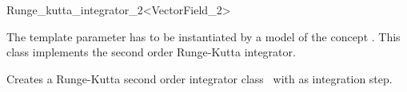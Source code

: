 

\begin{ccRefFunctionObjectClass}{Runge_kutta_integrator_2<VectorField_2>}  %

\ccDefinition

The template parameter  has to
be instantiated by a model of the concept . This class implements the second order Runge-Kutta integrator.

\ccCreation
{}
{Creates a Runge-Kutta second order integrator class \ccVar \ with  as integration step.}


\ccIsModel 

 \\

\ccSeeAlso
{} \\
\end{ccRefFunctionObjectClass}


